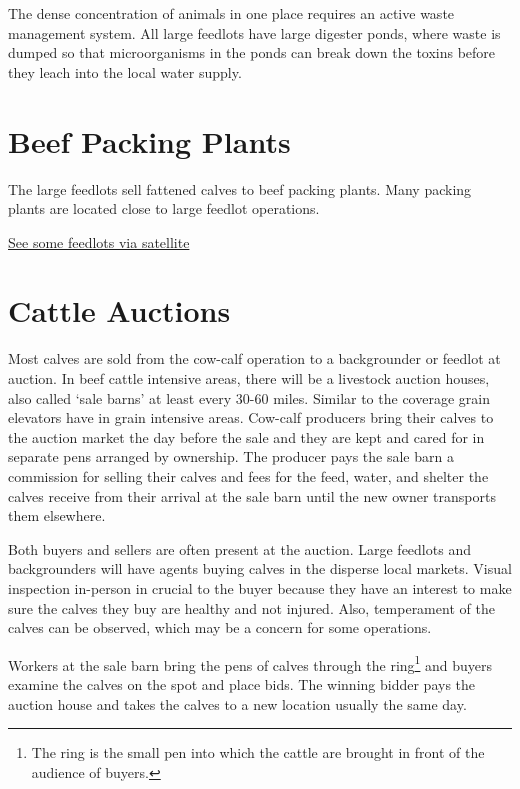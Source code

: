 \documentclass[
  letterpaper,
  DIV=11,
  numbers=noendperiod]{scrreprt}
\begin{document}
The dense concentration of animals in one place requires an active waste
management system. All large feedlots have large digester ponds, where
waste is dumped so that microorganisms in the ponds can break down the
toxins before they leach into the local water supply.

\hypertarget{beef-packing-plants}{%
\section{Beef Packing Plants}\label{beef-packing-plants}}

The large feedlots sell fattened calves to beef packing plants. Many
packing plants are located close to large feedlot operations.

\href{http://maps.google.com}{See some feedlots via satellite}

\hypertarget{cattle-auctions}{%
\section{Cattle Auctions}\label{cattle-auctions}}

Most calves are sold from the cow-calf operation to a backgrounder or
feedlot at auction. In beef cattle intensive areas, there will be a
livestock auction houses, also called `sale barns' at least every 30-60
miles. Similar to the coverage grain elevators have in grain intensive
areas. Cow-calf producers bring their calves to the auction market the
day before the sale and they are kept and cared for in separate pens
arranged by ownership. The producer pays the sale barn a commission for
selling their calves and fees for the feed, water, and shelter the
calves receive from their arrival at the sale barn until the new owner
transports them elsewhere.

Both buyers and sellers are often present at the auction. Large feedlots
and backgrounders will have agents buying calves in the disperse local
markets. Visual inspection in-person in crucial to the buyer because
they have an interest to make sure the calves they buy are healthy and
not injured. Also, temperament of the calves can be observed, which may
be a concern for some operations.

Workers at the sale barn bring the pens of calves through the
ring\footnote{The ring is the small pen into which the cattle are
  brought in front of the audience of buyers.} and buyers examine the
calves on the spot and place bids. The winning bidder pays the auction
house and takes the calves to a new location usually the same day.
\end{document}
